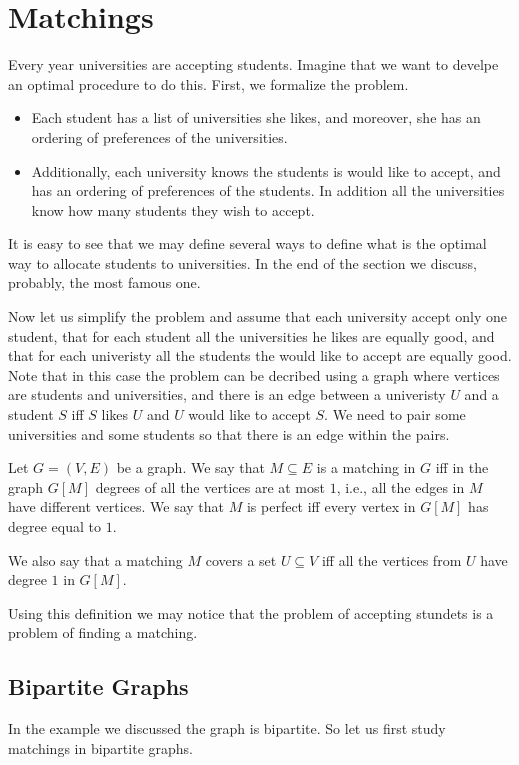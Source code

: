 \chapter{Matchings}
Every year universities are accepting students. Imagine that we want to develpe
an optimal procedure to do this. First, we formalize the
problem.
\begin{itemize}
  \item Each student has a list of universities she likes, and
    moreover, she has an ordering of preferences of the universities.
  \item Additionally, each university knows the students is would
    like to accept, and has an ordering of preferences of the students. In
    addition all the universities know how many students they wish to accept.
\end{itemize}
It is easy to see that we may define several ways to define what is the optimal
way to allocate students to universities. In the end of the section we discuss,
probably, the most famous one.

Now let us simplify the problem and assume that each university accept only one
student, that for each student all the universities he likes are equally good,
and that for each univeristy all the students the would like to accept are
equally good. Note that in this case the problem can be decribed using a graph
where vertices are students and universities, and there is an edge between a
univeristy $U$ and a student $S$ iff $S$ likes $U$ and $U$ would like to accept
$S$. We need to pair some universities and some students so that there is an
edge within the pairs.
\begin{definition}
  Let $G = (V, E)$ be a graph. We say that $M \subseteq E$ is a matching in $G$
  iff in the graph $G[M]$ degrees of all the vertices are at most $1$, i.e.,
  all the edges in $M$ have different vertices. We say that $M$ is perfect
  iff every vertex in $G[M]$ has degree equal to $1$.

  We also say that a matching $M$ covers a set $U \subseteq V$ iff all the
  vertices from $U$ have degree $1$ in $G[M]$.
\end{definition}
Using this definition we may notice that the problem of accepting stundets is a
problem of finding a matching.

\section{Bipartite Graphs}
In the example we discussed the graph is bipartite. So let us first study
matchings in bipartite graphs.

